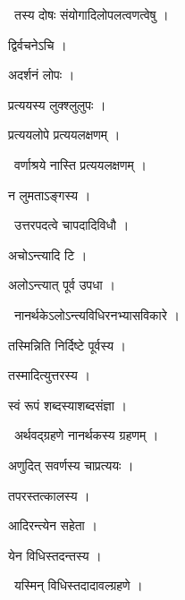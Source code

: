 \documentclass[10pt, openany, oneside]{book}
\begin{document}
\par\noindent\hspace{1.5em}{\vps वा॰}~{\qt तस्य दोषः संयोगादिलोपलत्वणत्वेषु ।}

\noindent द्विर्वचनेऽचि ।

\noindent अदर्शनं लोपः ।

\noindent प्रत्ययस्य लुक्श्लुलुपः ।

\noindent प्रत्ययलोपे प्रत्ययलक्षणम् ।

\par\noindent\hspace{1.5em}{\vps वा॰}~{\qt वर्णाश्रये नास्ति प्रत्ययलक्षणम् ।}

\noindent न लुमताऽङ्गस्य ।

\par\noindent\hspace{1.5em}{\vps वा॰}~{\qt उत्तरपदत्वे चापदादिविधौ ।}

\noindent अचोऽन्त्यादि टि ।

\noindent अलोऽन्त्यात् पूर्व उपधा ।

\par\noindent\hspace{1.5em}{\vps वा॰}~{\qt नानर्थकेऽलोऽन्त्यविधिरनभ्यासविकारे ।}

\noindent तस्मिन्निति निर्दिष्टे पूर्वस्य ।

\noindent तस्मादित्युत्तरस्य ।

\noindent स्वं रूपं शब्दस्याशब्दसंज्ञा ।

\par\noindent\hspace{1.5em}{\vps वा॰}~{\qt अर्थवद्ग्रहणे नानर्थकस्य ग्रहणम् ।}

\noindent अणुदित् सवर्णस्य चाप्रत्ययः ।

\noindent तपरस्तत्कालस्य ।

\noindent आदिरन्त्येन सहेता ।

\noindent येन विधिस्तदन्तस्य ।

\par\noindent\hspace{1.5em}{\vps वा॰}~{\qt यस्मिन् विधिस्तदादावल्ग्रहणे ।}
\end{document}
